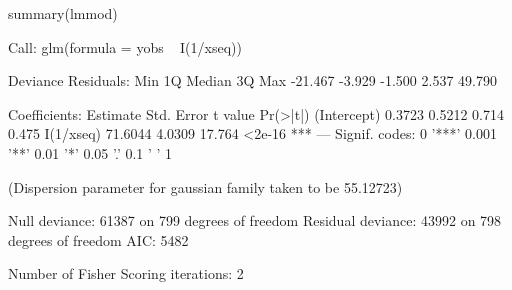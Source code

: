 \begin{Schunk}
\begin{Sinput}
 summary(lmmod)
\end{Sinput}
\begin{Soutput}
Call:
glm(formula = yobs ~ I(1/xseq))

Deviance Residuals: 
    Min       1Q   Median       3Q      Max  
-21.467   -3.929   -1.500    2.537   49.790  

Coefficients:
            Estimate Std. Error t value Pr(>|t|)    
(Intercept)   0.3723     0.5212   0.714    0.475    
I(1/xseq)    71.6044     4.0309  17.764   <2e-16 ***
---
Signif. codes:  0 '***' 0.001 '**' 0.01 '*' 0.05 '.' 0.1 ' ' 1

(Dispersion parameter for gaussian family taken to be 55.12723)

    Null deviance: 61387  on 799  degrees of freedom
Residual deviance: 43992  on 798  degrees of freedom
AIC: 5482

Number of Fisher Scoring iterations: 2
\end{Soutput}
\begin{Sinput}
 
\end{Sinput}
\end{Schunk}
